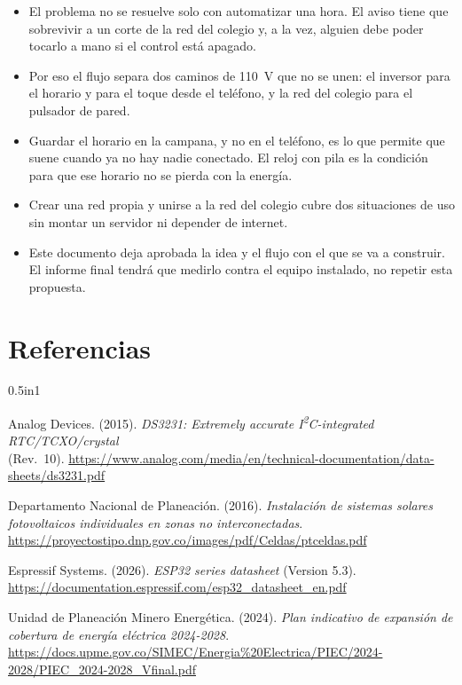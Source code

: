 \documentclass[12pt,letterpaper]{article}
\begin{document}
\begin{itemize}
    \item El problema no se resuelve solo con automatizar una hora. El aviso tiene que sobrevivir a un corte de la red del colegio y, a la vez, alguien debe poder tocarlo a mano si el control está apagado.
    \item Por eso el flujo separa dos caminos de 110~V que no se unen: el inversor para el horario y para el toque desde el teléfono, y la red del colegio para el pulsador de pared.
    \item Guardar el horario en la campana, y no en el teléfono, es lo que permite que suene cuando ya no hay nadie conectado. El reloj con pila es la condición para que ese horario no se pierda con la energía.
    \item Crear una red propia y unirse a la red del colegio cubre dos situaciones de uso sin montar un servidor ni depender de internet.
    \item Este documento deja aprobada la idea y el flujo con el que se va a construir. El informe final tendrá que medirlo contra el equipo instalado, no repetir esta propuesta.
\end{itemize}

\newpage
\section*{Referencias}

\begin{hangparas}{0.5in}{1}

Analog Devices. (2015). \textit{DS3231: Extremely accurate I\textsuperscript{2}C-integrated RTC/TCXO/crystal}\\
(Rev.~10). \url{https://www.analog.com/media/en/technical-documentation/data-sheets/ds3231.pdf}

Departamento Nacional de Planeación. (2016). \textit{Instalación de sistemas solares fotovoltaicos individuales en zonas no interconectadas}. \url{https://proyectostipo.dnp.gov.co/images/pdf/Celdas/ptceldas.pdf}

Espressif Systems. (2026). \textit{ESP32 series datasheet} (Version 5.3). \url{https://documentation.espressif.com/esp32_datasheet_en.pdf}

Unidad de Planeación Minero Energética. (2024). \textit{Plan indicativo de expansión de cobertura de energía eléctrica 2024-2028}. \url{https://docs.upme.gov.co/SIMEC/Energia%20Electrica/PIEC/2024-2028/PIEC_2024-2028_Vfinal.pdf}

\end{hangparas}
\end{document}
